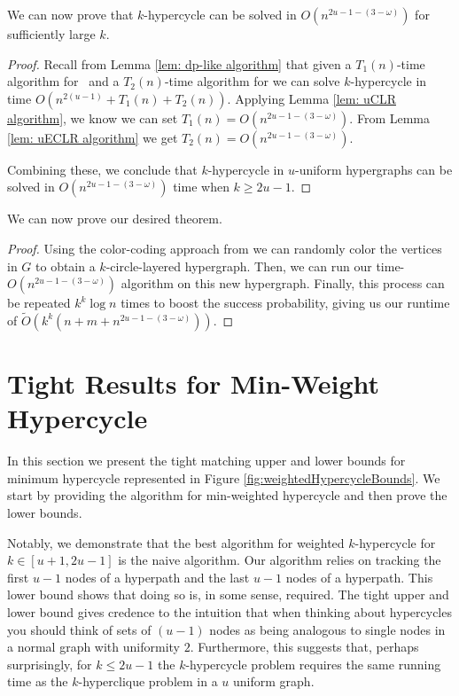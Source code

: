 \documentclass[11pt,letterpaper,pdftex]{article}
\begin{document}
We can now prove that $k$-hypercycle can be solved in $O(n^{2u-1-(3-\omega)})$ for sufficiently large $k$.

\matMulReach*

\begin{proof}
    Recall from Lemma \ref{lem: dp-like algorithm} that given a $T_1(n)$-time algorithm for \uCLR~and a $T_2(n)$-time algorithm for  we can solve $k$-hypercycle in time $O(n^{2(u-1)}+T_1(n)+T_2(n))$. 
    Applying Lemma \ref{lem: uCLR algorithm}, we know we can set $T_1(n)=O(n^{2u-1-(3-\omega)})$.
    From Lemma \ref{lem: uECLR algorithm} we get $T_2(n)=O(n^{2u-1-(3-\omega)})$.

    Combining these, we conclude that $k$-hypercycle in $u$-uniform hypergraphs can be solved in $O(n^{2u-1-(3-\omega)})$ time when $k \geq 2u-1$.
\end{proof}

We can now prove our desired theorem. 


\fastCycleDetect*

\begin{proof}
    Using the color-coding approach from \cite[Lemma~2.2]{LVW18} we can randomly color the vertices in $G$ to obtain a $k$-circle-layered hypergraph.
    Then, we can run our time-$O(n^{2u-1-(3-\omega)})$ algorithm on this new hypergraph.
    Finally, this process can be repeated $k^k \log{n}$ times to boost the success probability, giving us our runtime of $\tilde{O}(k^k(n+m+n^{2u-1-(3-\omega)}))$.
\end{proof}


 
\section{Tight Results for Min-Weight Hypercycle}
\label{sec:tight_weighted}
In this section we present the tight matching upper and lower bounds for minimum hypercycle represented in Figure \ref{fig:weightedHypercycleBounds}. We start by providing the algorithm for min-weighted hypercycle and then prove the lower bounds.

Notably, we demonstrate that the best algorithm for weighted $k$-hypercycle for $k \in [u+1, 2u-1]$ is the naive algorithm. Our algorithm relies on tracking the first $u-1$ nodes of a hyperpath and the last $u-1$ nodes of a hyperpath.  This lower bound shows that doing so is, in some sense, required. The tight upper and lower bound gives credence to the intuition that when thinking about hypercycles you should think of sets of $(u-1)$ nodes as being analogous to single nodes in a normal graph with uniformity $2$. Furthermore, this suggests that, perhaps surprisingly, for $k\leq 2u-1$ the $k$-hypercycle problem requires the same running time as the  $k$-hyperclique problem in a $u$ uniform graph. 
\end{document}

